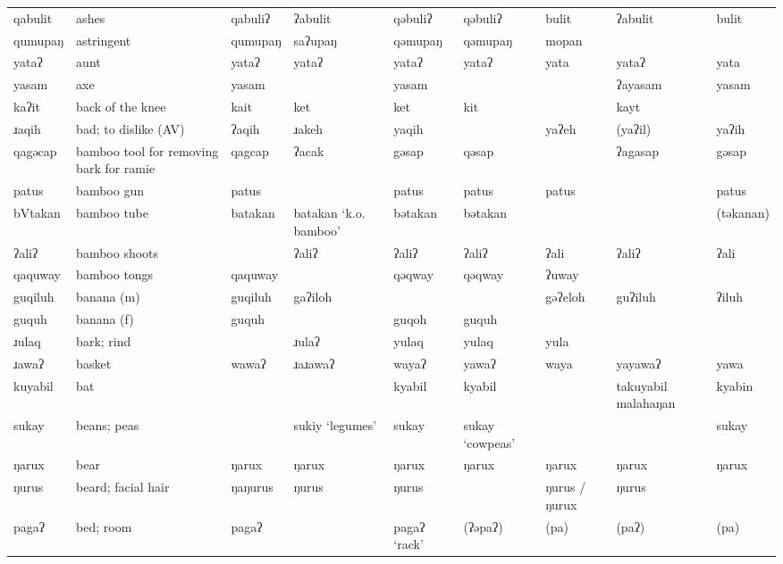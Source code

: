 \begin{landscape}
\begin{longtable}{*{9}{>{\raggedright\arraybackslash}p{}}}
\text{*}qabulit      & ashes & qabuliʔ & ʔabulit & qəbuliʔ & qəbuliʔ & bulit & ʔabulit & bulit\\
\text{*}qumupaŋ      & astringent & qumupaŋ & saʔupaŋ & qəmupaŋ & qəmupaŋ & mopan &  & \\
\text{*}yataʔ        & aunt & yataʔ & yataʔ & yataʔ & yataʔ & yata & yataʔ & yata\\
\text{*}yasam        & axe & yasam &  & yasam &  &  & ʔayasam & yasam\\
\text{*}kaʔit        & back of the knee & kait & ket & ket & kit &  & kayt & \\
\text{*}ɹaqih        & bad; to dislike (AV) & ʔaqih & ɹakeh & yaqih &  & yaʔeh & (yaʔil) & yaʔih\\
\text{*}qagəcap      & bamboo tool for removing bark for ramie & qagcap & ʔacak & gəsap & qəsap &  & ʔagasap & gəsap\\
\text{*}patus        & bamboo gun & patus &  & patus & patus & patus &  & patus\\
\text{*}bVtakan      & bamboo tube & batakan & batakan \newline `k.o. bamboo' & bətakan & bətakan &  &  & (təkanan)\\
\text{*}ʔaliʔ        & bamboo shoots &  & ʔaliʔ & ʔaliʔ & ʔaliʔ & ʔali & ʔaliʔ & ʔali\\
\text{*}qaquway      & bamboo tongs & qaquway &  & qəqway & qəqway & ʔuway &  & \\
\text{*}guqiluh      & banana (m) & guqiluh & gaʔiloh &  &  & gəʔeloh & guʔiluh & ʔiluh\\
\text{*}guquh        & banana (f) & guquh &  & guqoh & guquh &  &  & \\
\text{*}ɹulaq        & bark; rind &  & ɹulaʔ & yulaq & yulaq & yula &  & \\
\text{*}ɹawaʔ        & basket & wawaʔ & ɹaɹawaʔ & wayaʔ & yawaʔ & waya & yayawaʔ & yawa\\
\text{*}kuyabil     & bat &  &  & kyabil & kyabil &  & takuyabil malahaŋan & kyabin\\
\text{*}sukay        & beans; peas &  & sukiy `legumes' & sukay & sukay \newline `cowpeas' &  &  & sukay\\
\text{*}ŋarux        & bear & ŋarux & ŋarux & ŋarux & ŋarux & ŋarux & ŋarux & ŋarux\\
\text{*}ŋurus        & beard; facial hair & ŋaŋurus & ŋurus & ŋurus &  & ŋurus / ŋurux & ŋurus & \\
\text{*}pagaʔ        & bed; room & pagaʔ &  & pagaʔ `rack' & (ʔəpaʔ) & (pa) & (paʔ) & (pa)\\

\end{longtable}
\end{landscape}
